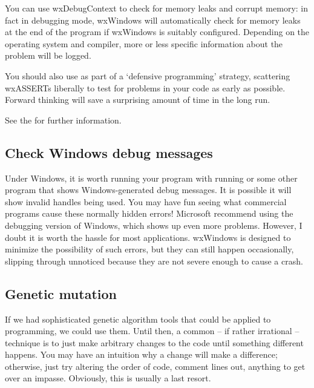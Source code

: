 You can use wxDebugContext to check for
memory leaks and corrupt memory: in fact in debugging mode, wxWindows will
automatically check for memory leaks at the end of the program if wxWindows is suitably
configured. Depending on the operating system and compiler, more or less
specific information about the problem will be logged.

You should also use  as part of a `defensive programming' strategy,
scattering wxASSERTs liberally to test for problems in your code as early as possible. Forward thinking
will save a surprising amount of time in the long run.

See the  for further information.

\subsection{Check Windows debug messages}

Under Windows, it is worth running your program with 
 running or
some other program that shows Windows-generated debug messages. It is
possible it will show invalid handles being used. You may have fun seeing
what commercial programs cause these normally hidden errors! Microsoft
recommend using the debugging version of Windows, which shows up even
more problems. However, I doubt it is worth the hassle for most
applications. wxWindows is designed to minimize the possibility of such
errors, but they can still happen occasionally, slipping through unnoticed
because they are not severe enough to cause a crash.

\subsection{Genetic mutation}

If we had sophisticated genetic algorithm tools that could be applied
to programming, we could use them. Until then, a common -- if rather irrational --
technique is to just make arbitrary changes to the code until something
different happens. You may have an intuition why a change will make a difference;
otherwise, just try altering the order of code, comment lines out, anything
to get over an impasse. Obviously, this is usually a last resort.

